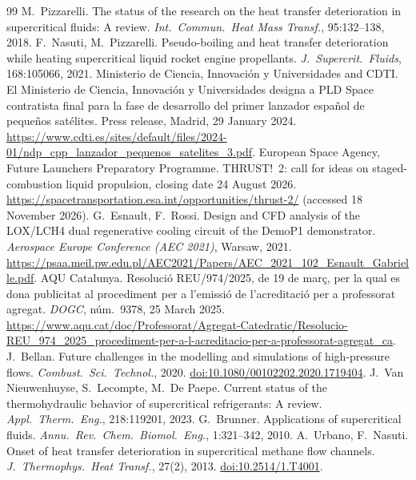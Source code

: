 \documentclass[11pt]{article}
\begin{document}
\begin{thebibliography}{99}\small
{} M.\ Pizzarelli. The status of the research on the heat transfer deterioration in supercritical fluids: A review. \emph{Int.\ Commun.\ Heat Mass Transf.}, 95:132--138, 2018.
 F.\ Nasuti, M.\ Pizzarelli. Pseudo-boiling and heat transfer deterioration while heating supercritical liquid rocket engine propellants. \emph{J.\ Supercrit.\ Fluids}, 168:105066, 2021.
 Ministerio de Ciencia, Innovaci\'on y Universidades and CDTI. El Ministerio de Ciencia, Innovaci\'on y Universidades designa a PLD Space contratista final para la fase de desarrollo del primer lanzador espa\~nol de peque\~nos sat\'elites. Press release, Madrid, 29 January 2024. \url{https://www.cdti.es/sites/default/files/2024-01/ndp_cpp_lanzador_pequenos_satelites_3.pdf}.
 European Space Agency, Future Launchers Preparatory Programme. THRUST!~2: call for ideas on staged-combustion liquid propulsion, closing date 24 August 2026. \url{https://spacetransportation.esa.int/opportunities/thrust-2/} (accessed 18 November 2026).
 G.\ Esnault, F.\ Rossi. Design and CFD analysis of the LOX/LCH4 dual regenerative cooling circuit of the DemoP1 demonstrator. \emph{Aerospace Europe Conference (AEC 2021)}, Warsaw, 2021. \url{https://psaa.meil.pw.edu.pl/AEC2021/Papers/AEC_2021_102_Esnault_Gabrielle.pdf}.
 AQU Catalunya. Resoluci\'o REU/974/2025, de 19 de mar\c{c}, per la qual es dona publicitat al procediment per a l'emissi\'o de l'acreditaci\'o per a professorat agregat. \emph{DOGC}, n\'um.~9378, 25 March 2025. \url{https://www.aqu.cat/doc/Professorat/Agregat-Catedratic/Resolucio-REU_974_2025_procediment-per-a-l-acreditacio-per-a-professorat-agregat_ca}.
 J.\ Bellan. Future challenges in the modelling and simulations of high-pressure flows. \emph{Combust.\ Sci.\ Technol.}, 2020. \href{https://doi.org/10.1080/00102202.2020.1719404}{doi:10.1080/00102202.2020.1719404}.
 J.\ Van Nieuwenhuyse, S.\ Lecompte, M.\ De Paepe. Current status of the thermohydraulic behavior of supercritical refrigerants: A review. \emph{Appl.\ Therm.\ Eng.}, 218:119201, 2023.
 G.\ Brunner. Applications of supercritical fluids. \emph{Annu.\ Rev.\ Chem.\ Biomol.\ Eng.}, 1:321--342, 2010.
 A.\ Urbano, F.\ Nasuti. Onset of heat transfer deterioration in supercritical methane flow channels. \emph{J.\ Thermophys.\ Heat Transf.}, 27(2), 2013. \href{https://doi.org/10.2514/1.T4001}{doi:10.2514/1.T4001}.

\end{thebibliography}
\end{document}
